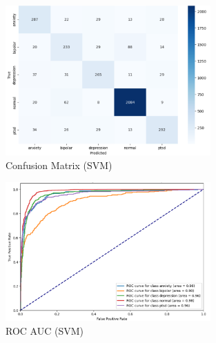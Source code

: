 \vspace{0.25em}

\begin{figure}[h!]  
    \centering
    \includegraphics[width=0.7\textwidth]{Images/SVM Confusion Matrix.png}  
    \caption{Confusion Matrix (SVM)}
    \label{SVMCM}  %
\end{figure}

\begin{figure}[h!]  
    \centering
    \includegraphics[width=0.7\textwidth]{Images/SVM ROC.png}  
    \caption{ROC AUC (SVM)}
    \label{SVMSOC}  %
\end{figure}

